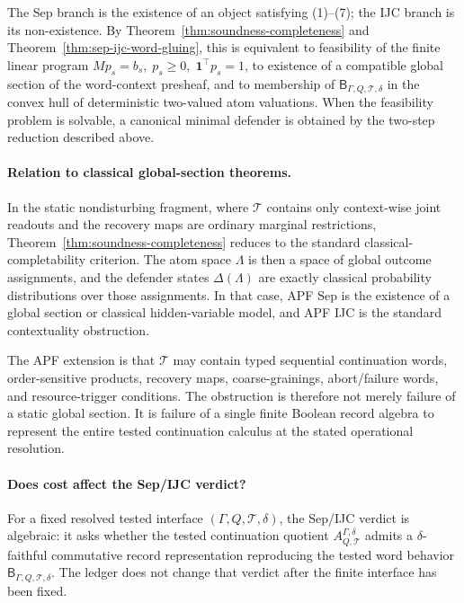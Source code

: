\documentclass[11pt]{article}
\begin{document}
The Sep branch is the existence of an object satisfying (1)--(7);
the IJC branch is its non-existence.  By
Theorem~\ref{thm:soundness-completeness} and
Theorem~\ref{thm:sep-ijc-word-gluing}, this is equivalent to
feasibility of the finite linear program
$Mp_s = b_s,\;p_s\ge 0,\;\mathbf 1^\top p_s=1$, to existence of a
compatible global section of the word-context presheaf, and to
membership of $\mathsf B_{\Gamma,Q,\mathcal T,\delta}$ in the
convex hull of deterministic two-valued atom valuations.  When the
feasibility problem is solvable, a canonical minimal defender is
obtained by the two-step reduction described above.

\paragraph{Relation to classical global-section theorems.}
In the static nondisturbing fragment, where $\mathcal T$ contains only
context-wise joint readouts and the recovery maps are ordinary
marginal restrictions, Theorem~\ref{thm:soundness-completeness}
reduces to the standard classical-completability criterion.  The atom
space $\Lambda$ is then a space of global outcome assignments, and the
defender states $\Delta(\Lambda)$ are exactly classical probability
distributions over those assignments.  In that case, APF Sep is the
existence of a global section or classical hidden-variable model, and
APF IJC is the standard contextuality obstruction.

The APF extension is that $\mathcal T$ may contain typed sequential
continuation words, order-sensitive products, recovery maps,
coarse-grainings, abort/failure words, and resource-trigger
conditions.  The obstruction is therefore not merely failure of a
static global section.  It is failure of a single finite Boolean
record algebra to represent the entire tested continuation calculus
at the stated operational resolution.

\paragraph{Does cost affect the Sep/IJC verdict?}
For a fixed resolved tested interface
$(\Gamma,Q,\mathcal T,\delta)$, the Sep/IJC verdict is algebraic: it
asks whether the tested continuation quotient
$A^{\Gamma,\delta}_{Q,\mathcal T}$ admits a $\delta$-faithful
commutative record representation reproducing the tested word
behavior $\mathsf B_{\Gamma,Q,\mathcal T,\delta}$.  The ledger does
not change that verdict after the finite interface has been fixed.
\end{document}
